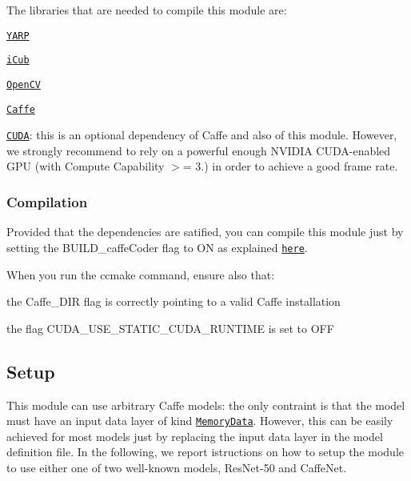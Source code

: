 The libraries that are needed to compile this module are\+:


\begin{DoxyItemize}
\item \href{https://github.com/robotology/yarp}{\tt Y\+A\+RP}
\item \href{https://github.com/robotology/icub-main}{\tt i\+Cub}
\item \href{http://opencv.org/releases.html}{\tt Open\+CV}
\item \href{https://www.github.com/BVLC/caffe.git}{\tt Caffe}
\item \href{https://developer.nvidia.com/cuda-zone}{\tt C\+U\+DA}\+: this is an optional dependency of Caffe and also of this module. However, we strongly recommend to rely on a powerful enough N\+V\+I\+D\+IA C\+U\+D\+A-\/enabled G\+PU (with Compute Capability $>$= 3.) in order to achieve a good frame rate.
\end{DoxyItemize}

\subsubsection*{Compilation}

Provided that the dependencies are satified, you can compile this module just by setting the {\ttfamily B\+U\+I\+L\+D\+\_\+caffe\+Coder} flag to {\ttfamily ON} as explained \href{https://www.github.com/robotology/himrep#compilation}{\tt here}.

When you run the {\ttfamily ccmake} command, ensure also that\+:


\begin{DoxyItemize}
\item the {\ttfamily Caffe\+\_\+\+D\+IR} flag is correctly pointing to a valid Caffe installation
\item the flag {\ttfamily C\+U\+D\+A\+\_\+\+U\+S\+E\+\_\+\+S\+T\+A\+T\+I\+C\+\_\+\+C\+U\+D\+A\+\_\+\+R\+U\+N\+T\+I\+ME} is set to {\ttfamily O\+FF}
\end{DoxyItemize}

\subsection*{Setup}

This module can use arbitrary Caffe models\+: the only contraint is that the model must have an input data layer of kind \href{http://caffe.berkeleyvision.org/tutorial/layers/memorydata.html}{\tt Memory\+Data}. However, this can be easily achieved for most models just by replacing the input data layer in the model definition file. In the following, we report istructions on how to setup the module to use either one of two well-\/known models, {\ttfamily Res\+Net-\/50} and {\ttfamily Caffe\+Net}.

